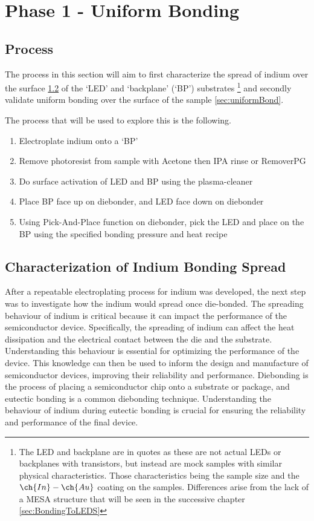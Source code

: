 \section{Phase 1 - Uniform Bonding}

\subsection{Process}
The process in this section will aim to first characterize the spread of indium over the surface \ref{sec:indiumSpread} of the `LED' and `backplane' (`BP') substrates
\footnote{The LED and backplane are in quotes as these are not actual LEDs or backplanes with transistors, but instead are mock samples with similar physical characteristics.
Those characteristics being the sample size and the $\ch{In}-\ch{Au}$ coating on the samples.
Differences arise from the lack of a MESA structure that will be seen in the successive chapter
\ref{sec:BondingToLEDS}}
and secondly validate uniform bonding over the surface of the sample \ref{sec:uniformBond}.

The process that will be used to explore this is the following.
\begin{enumerate}
    \item Electroplate indium onto a `BP'
    \item Remove photoresist from sample with Acetone then IPA rinse or RemoverPG
    \item Do surface activation of LED and BP using the plasma-cleaner
    \item Place BP face up on diebonder, and LED face down on diebonder
    \item Using Pick-And-Place function on diebonder, pick the LED and place on the BP using the specified bonding pressure and heat recipe
\end{enumerate}


\subsection{Characterization of Indium Bonding Spread}
\label{sec:indiumSpread}
After a repeatable electroplating process for indium was developed, the next step was to investigate how the indium would spread once die-bonded. The spreading behaviour of indium is critical because it can impact the performance of the semiconductor device. Specifically, the spreading of indium can affect the heat dissipation and the electrical contact between the die and the substrate. Understanding this behaviour is essential for optimizing the performance of the device.
This knowledge can then be used to inform the design and manufacture of semiconductor devices, improving their reliability and performance.
Diebonding is the process of placing a semiconductor chip onto a substrate or package, and eutectic bonding is a common diebonding technique. Understanding the behaviour of indium during eutectic bonding is crucial for ensuring the reliability and performance of the final device.

